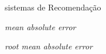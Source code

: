 \item [SR]      sistemas de Recomendação
\item [MAE]     \textit{mean absolute error}
\item [RMSE]    \textit{root mean absolute error}